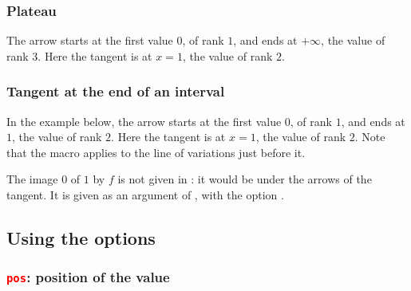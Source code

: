 \subsubsection{Plateau}
The arrow starts at the first value $0$, of rank $1$, and ends at $+\infty$, the value of rank $3$. Here the tangent is at $x=1$, the value of rank $2$.

\begin{tkzexample}[vbox]
\end{tkzexample}

\subsubsection{Tangent at the end of an interval}
In the example below, the arrow starts at the first value $0$, of rank $1$, and ends at $1$, the value of rank $2$. Here the tangent is at $x=1$, the value of rank $2$. Note that the macro  applies to the line of variations just before it.

The image $0$ of $1$ by $f$ is not given in : it would be under the arrows of the tangent. It is given as an argument of , with the option .

\begin{tkzexample}[vbox]
\end{tkzexample}

\subsection{Using the options}

\subsubsection{\texttt{\textcolor{red}{pos}}: position of the value}

\begin{tkzexample}[vbox]
\end{tkzexample}

